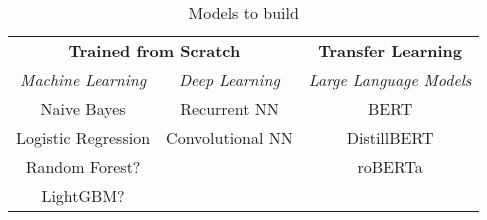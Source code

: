 \begin{table}[!ht]
\centering
	\begin{tabular}{ccc}
		\toprule

		\multicolumn{2}{c}{\textbf{Trained from Scratch}} & \textbf{Transfer Learning}\\
		\cmidrule(r){1-2} \cmidrule(l){3-3}
		\emph{Machine Learning} & \emph{Deep Learning} & \emph{Large Language Models}\\
		\midrule
		Naive Bayes & Recurrent NN & BERT \\
		Logistic Regression & Convolutional NN & DistillBERT \\
		Random Forest? & & roBERTa \\
		LightGBM? & & \\
		\bottomrule		
	\end{tabular}
	\caption{Models to build}
\end{table}